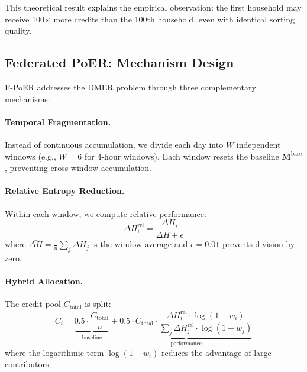 \documentclass[12pt,a4paper]{article}
\begin{document}
This theoretical result explains the empirical observation: the first household may receive 100$\times$ more credits than the 100th household, even with identical sorting quality.

\subsection{Federated PoER: Mechanism Design}

F-PoER addresses the DMER problem through three complementary mechanisms:

\paragraph{Temporal Fragmentation.} Instead of continuous accumulation, we divide each day into $W$ independent windows (e.g., $W=6$ for 4-hour windows). Each window resets the baseline $\mathbf{M}^{\text{base}}$, preventing cross-window accumulation.

\paragraph{Relative Entropy Reduction.} Within each window, we compute relative performance:
\begin{equation}
\Delta H_i^{\text{rel}} = \frac{\Delta H_i}{\bar{\Delta H} + \epsilon}
\end{equation}
where $\bar{\Delta H} = \frac{1}{n}\sum_j \Delta H_j$ is the window average and $\epsilon = 0.01$ prevents division by zero.

\paragraph{Hybrid Allocation.} The credit pool $C_{\text{total}}$ is split:
\begin{equation}
C_i = \underbrace{0.5 \cdot \frac{C_{\text{total}}}{n}}_{\text{baseline}} + \underbrace{0.5 \cdot C_{\text{total}} \cdot \frac{\Delta H_i^{\text{rel}} \cdot \log(1+w_i)}{\sum_j \Delta H_j^{\text{rel}} \cdot \log(1+w_j)}}_{\text{performance}}
\end{equation}
where the logarithmic term $\log(1+w_i)$ reduces the advantage of large contributors.
\end{document}
